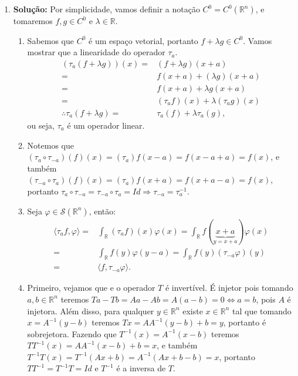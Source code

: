 \documentclass{article}
\begin{document}
\begin{enumerate}
		\item \textbf{Solução:} Por simplicidade, vamos definir a notação $C^{0} = C^{0}(\mathbb{R}^{n})$, e tomaremos $f, g \in C^{0}$ e $\lambda \in \mathbb{R}$.
			\begin{enumerate}
				\item Sabemos que $C^{0}$ é um espaço vetorial, portanto $f + \lambda g \in C^{0}$. Vamos mostrar que a linearidade do operador $\tau_{a}$.
				$$
				\begin{aligned}
				(\tau_{a}(f+\lambda g))(x) = &  (f+\lambda g)(x+a) \\
				= & f(x+a) +(\lambda g)(x+a)
				\\
				= & f(x+a) +\lambda g(x+a)
				\\
				= & (\tau_{a}f)(x) +\lambda (\tau_{a}g)(x)
				\\
				\therefore \tau_{a}(f+\lambda g) = & \tau_{a}(f)+\lambda \tau_{a}(g),
				\end{aligned}
				$$
				ou seja, $\tau_{a}$ é um operador linear.
				
				\item Notemos que $(\tau_{a} \circ \tau_{-a})(f)(x) = (\tau_{a})f(x-a) = f(x- a+a) = f(x)$, e também $(\tau_{-a} \circ \tau_{a})(f)(x) = (\tau_{a})f(x+a) = f(x+a-a) = f(x)$, portanto $\tau_{a} \circ \tau_{-a} = \tau_{-a} \circ \tau_{a} = Id \Rightarrow \tau_{-a} = \tau^{-1}_{a}$.
				
				\item Seja $\varphi \in \mathcal{S}(\mathbb{R}^{n})$, então:
				$$
				\begin{aligned}
				\langle \tau_{a}f, \varphi \rangle = & \int_{\mathbb{R}} (\tau_{a}f)(x)\varphi(x)
				= \int_{\mathbb{R}} f(\underbrace{ x+a }_{y = x+a}) \varphi(x)
				\\
				= & \int_{\mathbb{R}} f(y)\varphi(y-a)
				=  \int_{\mathbb{R}} f(y) (\tau_{-a}\varphi)(y) 
				\\
				= & \langle f, \tau_{-a}\varphi \rangle.
				\end{aligned}
				$$
				
				\item Primeiro, vejamos que e o operador $T$ é invertível. É injetor pois tomando $a, b \in \mathbb{R}^{n}$ teremos $Ta- Tb = Aa - Ab = A(a-b) = 0 \iff a=b$, pois $A$ é injetora. Além disso, para qualquer $y \in \mathbb{R}^{n}$ existe $x \in \mathbb{R}^{n}$ tal que tomando $x = A^{-1}(y -b)$ teremos $Tx = AA^{-1}(y -b) + b = y$, portanto é sobrejetora. Fazendo que $T^{-1}(x) = A^{-1}(x - b)$ teremos $TT^{-1}(x) = AA^{-1}(x - b) + b = x$, e também $T^{-1}T(x) = T^{-1}(Ax + b) = A^{-1}(Ax+b - b) = x$, portanto $TT^{-1} = T^{-1}T = Id$ e $T^{-1}$ é a inversa de $T$.
				

\end{enumerate}
\end{enumerate}
\end{document}
